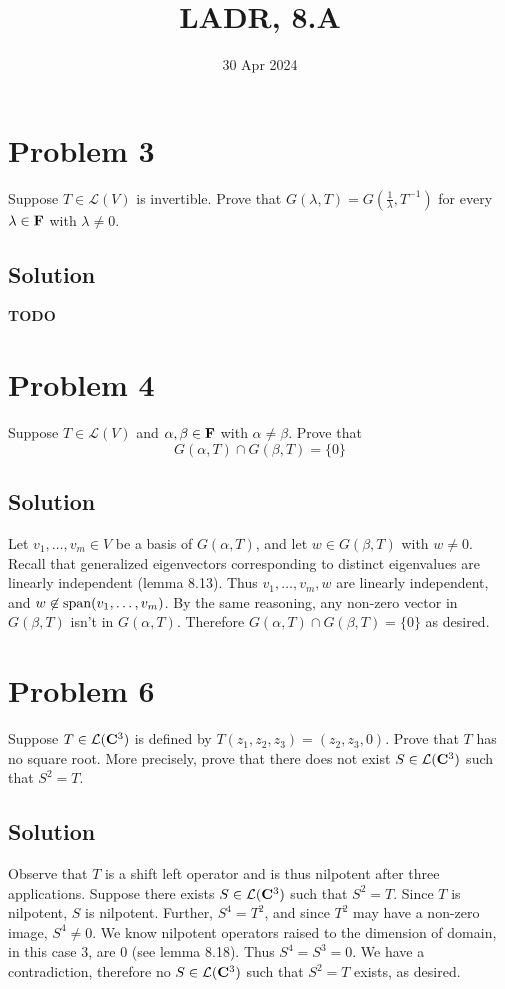 \documentclass{article}
\title{LADR, 8.A}
\date{30 Apr 2024}
\begin{document}
\maketitle

\section*{Problem 3}
Suppose $T\in\mathcal{L}(V)$ is invertible. Prove that $G(\lambda, T)=G(\frac{1}{\lambda}, T^{-1})$ for every $\lambda\in\mathbf{F}$ with $\lambda\neq0$.

\subsection*{Solution}
\textbf{TODO}

\section*{Problem 4}
Suppose $T\in\mathcal{L}(V)$ and $\alpha,\beta\in\mathbf{F}$ with $\alpha\neq\beta$. Prove that
\[G(\alpha, T)\cap G(\beta, T)=\{0\}\]

\subsection*{Solution}
Let $v_1,\ldots,v_m\in V$ be a basis of $G(\alpha, T)$, and let $w\in G(\beta, T)$ with $w\neq 0$. Recall that generalized eigenvectors corresponding to distinct eigenvalues are linearly independent (lemma 8.13). Thus $v_1,\ldots,v_m,w$ are linearly independent, and $w\not\in\text{span}(v_1,\ldots,v_m)$. By the same reasoning, any non-zero vector in $G(\beta, T)$ isn't in $G(\alpha, T)$. Therefore $G(\alpha, T)\cap G(\beta, T)=\{0\}$ as desired.

\section*{Problem 6}
Suppose $T\in\mathcal{L}(\mathbf{C}^3)$ is defined by $T(z_1,z_2,z_3)=(z_2, z_3, 0)$. Prove that $T$ has no square root. More precisely, prove that there does not exist $S\in\mathcal{L}(\mathbf{C}^3)$ such that $S^2=T$.

\subsection*{Solution}
Observe that $T$ is a shift left operator and is thus nilpotent after three applications. Suppose there exists $S\in\mathcal{L}(\mathbf{C}^3)$ such that $S^2=T$. Since $T$ is nilpotent, $S$ is nilpotent. Further, $S^4=T^2$, and since $T^2$ may have a non-zero image, $S^4\neq 0$. We know nilpotent operators raised to the dimension of domain, in this case $3$, are $0$ (see lemma 8.18). Thus $S^4=S^3=0$. We have a contradiction, therefore no $S\in\mathcal{L}(\mathbf{C}^3)$ such that $S^2=T$ exists, as desired.
\end{document}

